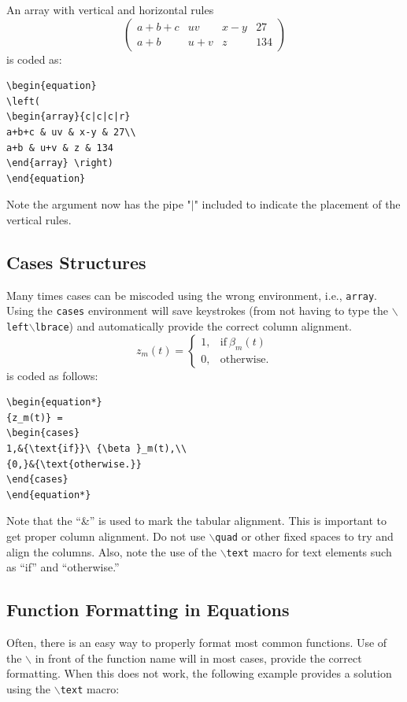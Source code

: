 \documentclass[lettersize,journal]{IEEEtran}
\begin{document}
An array with vertical and horizontal rules
\begin{equation}
\left( \begin{array}{c|c|c|r}
a+b+c & uv & x-y & 27\\ \hline
a+b & u+v & z & 134
\end{array}\right)
\end{equation}
is coded as:
\begin{verbatim}
\begin{equation}
\left(
\begin{array}{c|c|c|r}
a+b+c & uv & x-y & 27\\
a+b & u+v & z & 134
\end{array} \right)
\end{equation}
\end{verbatim}
Note the argument now has the pipe "$\vert$" included to indicate the placement of the vertical rules.


\subsection{Cases Structures}
Many times cases can be miscoded using the wrong environment, i.e., {\tt{array}}. Using the {\tt{cases}} environment will save keystrokes (from not having to type the $\backslash${\tt{left}}$\backslash${\tt{lbrace}}) and automatically provide the correct column alignment.
\begin{equation*}
{z_m(t)} = \begin{cases}
1,&{\text{if}}\ {\beta }_m(t) \\
{0,}&{\text{otherwise.}}
\end{cases}
\end{equation*}
\noindent is coded as follows:
\begin{verbatim}
\begin{equation*}
{z_m(t)} =
\begin{cases}
1,&{\text{if}}\ {\beta }_m(t),\\
{0,}&{\text{otherwise.}}
\end{cases}
\end{equation*}
\end{verbatim}
\noindent Note that the ``\&'' is used to mark the tabular alignment. This is important to get  proper column alignment. Do not use $\backslash${\tt{quad}} or other fixed spaces to try and align the columns. Also, note the use of the $\backslash${\tt{text}} macro for text elements such as ``if'' and ``otherwise.''

\subsection{Function Formatting in Equations}
Often, there is an easy way to properly format most common functions. Use of the $\backslash$ in front of the function name will in most cases, provide the correct formatting. When this does not work, the following example provides a solution using the $\backslash${\tt{text}} macro:
\end{document}
